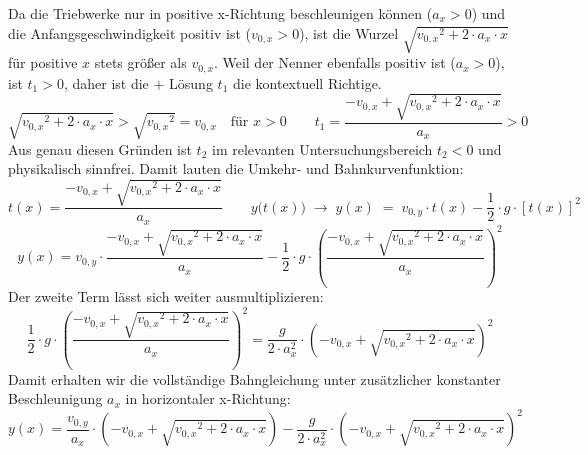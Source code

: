 Da die Triebwerke nur in positive x-Richtung beschleunigen können ($a_x > 0$) und die Anfangsgeschwindigkeit positiv ist ($v_{0,x} > 0$), ist die Wurzel $\sqrt{{v_{0,x}}^2 + 2 \cdot a_x \cdot x}$ für positive $x$ stets größer als $v_{0,x}$. Weil der Nenner ebenfalls positiv ist ($a_x > 0$), ist $t_1 > 0$, daher ist die $+$ Lösung $t_1$ die kontextuell Richtige.
\[
\sqrt{{v_{0,x}}^2 + 2 \cdot a_x \cdot x} > \sqrt{{v_{0,x}}^2} = v_{0,x} \quad \text{für } x > 0 \qquad t_1 = \frac{-v_{0,x} + \sqrt{{v_{0,x}}^2 + 2 \cdot a_x \cdot x}}{a_x} > 0
\]
Aus genau diesen Gründen ist $t_2$ im relevanten Untersuchungsbereich $t_2 < 0$ und physikalisch sinnfrei. Damit lauten die Umkehr- und Bahnkurvenfunktion: 
\[
t(x) = \frac{-v_{0,x} + \sqrt{{v_{0,x}}^2 + 2 \cdot a_x \cdot x}}{a_x} \qquad y\bigl(t(x)\bigr) \; \rightarrow \; y(x) \;= \; v_{0,y} \cdot t(x) - \frac{1}{2} \cdot g \cdot [t(x)]^2
\]
\[
y(x) = v_{0,y} \cdot \frac{-v_{0,x} + \sqrt{{v_{0,x}}^2 + 2 \cdot a_x \cdot x}}{a_x} - \frac{1}{2} \cdot g \cdot \left(\frac{-v_{0,x} + \sqrt{{v_{0,x}}^2 + 2 \cdot a_x \cdot x}}{a_x}\right)^2
\]
Der zweite Term lässt sich weiter ausmultiplizieren:
\[
\frac{1}{2} \cdot g \cdot \left(\frac{-v_{0,x} + \sqrt{{v_{0,x}}^2 + 2 \cdot a_x \cdot x}}{a_x}\right)^2 = \frac{g}{2 \cdot a_x^2} \cdot \left(-v_{0,x} + \sqrt{{v_{0,x}}^2 + 2 \cdot a_x \cdot x}\right)^2
\]
Damit erhalten wir die vollständige Bahngleichung unter zusätzlicher konstanter Beschleunigung $a_x$ in horizontaler x-Richtung:
\[
y(x) = \frac{v_{0,y}}{a_x} \cdot \left(-v_{0,x} + \sqrt{{v_{0,x}}^2 + 2 \cdot a_x \cdot x}\right) - \frac{g}{2 \cdot a_x^2} \cdot \left(-v_{0,x} + \sqrt{{v_{0,x}}^2 + 2 \cdot a_x \cdot x}\right)^2
\]


